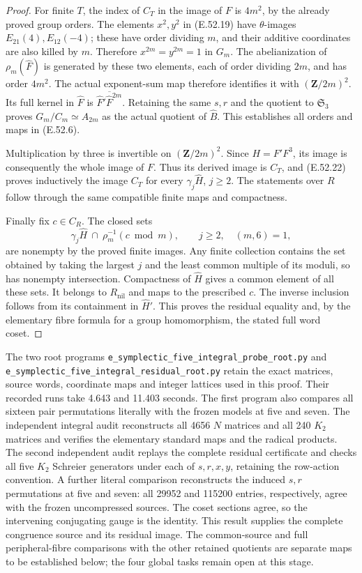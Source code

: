 \begin{proof}
For finite $T$, the index of $C_T$ in the image of
$F$ is $4m^2$, by the already proved group orders.
The elements $x^2,y^2$ in \textup{(E.52.19)} have
$\theta$-images $E_{21}(4),E_{12}(-4)$; these have
order dividing $m$, and their additive coordinates
are also killed by $m$.
Therefore $x^{2m}=y^{2m}=1$ in $G_m$.
The abelianization of $\rho_m(\widehat F)$ is generated
by these two elements, each of order dividing $2m$,
and has order $4m^2$. The actual exponent-sum map
therefore identifies it with $(\mathbf Z/2m)^2$.
Its full kernel in $\widehat F$ is
$\overline{\widehat F'\widehat F^{2m}}$.
Retaining the same $s,r$ and the quotient to
$\mathfrak S_3$ proves $G_m/C_m\simeq A_{2m}$ as
the actual quotient of $\widehat B$.
This establishes all orders and maps in
\textup{(E.52.6)}.

Multiplication by three is invertible on
$(\mathbf Z/2m)^2$. Since $H=F'F^3$, its image
is consequently the whole image of $F$.
Thus its derived image is $C_T$, and
\textup{(E.52.22)} proves inductively the image
$C_T$ for every $\gamma_j\widehat H$, $j\geq2$.
The statements over $R$ follow through the same
compatible finite maps and compactness.

Finally fix $c\in C_R$. The closed sets
\[
 \gamma_j\widehat H\ \cap\
      \rho_m^{-1}(c\bmod m),\qquad j\geq2,\quad(m,6)=1,
 \tag{E.52.23}
\]
are nonempty by the proved finite images.
Any finite collection contains the set obtained
by taking the largest $j$ and the least common
multiple of its moduli, so has nonempty intersection.
Compactness of $\widehat H$ gives a common element
of all these sets. It belongs to $R_{\mathrm{nil}}$
and maps to the prescribed $c$.
The inverse inclusion follows from its containment
in $\widehat H'$. This proves the residual equality
and, by the elementary fibre formula for a group
homomorphism, the stated full word coset.
\end{proof}

The two root programs
\texttt{e\_symplectic\_five\_integral\_probe\_root.py}
and
\texttt{e\_symplectic\_five\_integral\_residual\_root.py}
retain the exact matrices, source words, coordinate
maps and integer lattices used in this proof.
Their recorded runs take 4.643 and 11.403 seconds.
The first program also compares all sixteen pair
permutations literally with the frozen models at
five and seven. The independent integral audit
reconstructs all 4656 $N$ matrices and all 240
$K_2$ matrices and verifies the elementary standard
maps and the radical products.
The second independent audit replays the complete residual
certificate and checks all five $K_2$ Schreier generators
under each of $s,r,x,y$, retaining the row-action convention.
A further literal comparison reconstructs the induced $s,r$
permutations at five and seven: all 29952 and 115200
entries, respectively, agree with the frozen uncompressed
sources. The coset sections agree, so the intervening
conjugating gauge is the identity.
This result supplies the complete congruence source
and its residual image. The common-source and full
peripheral-fibre comparisons with the other retained
quotients are separate maps to be established below;
the four global tasks remain open at this stage.
